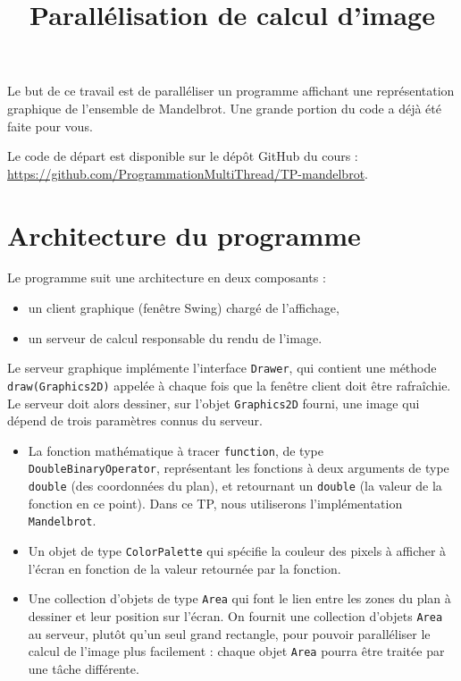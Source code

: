 \documentclass{td}
\title{Parallélisation de calcul d'image}
\begin{document}
\maketitle

Le but de ce travail est de paralléliser un programme affichant une représentation
graphique de l'ensemble de Mandelbrot. Une grande portion du code a déjà été faite pour vous.

Le code de départ est disponible sur le dépôt GitHub du cours :
\url{https://github.com/ProgrammationMultiThread/TP-mandelbrot}.

\section{Architecture du programme}

Le programme suit une architecture en deux composants :
\begin{itemize}
\item un client graphique (fenêtre Swing) chargé de l'affichage,
\item un serveur de calcul responsable du rendu de l'image.
\end{itemize}

Le serveur graphique implémente l'interface \lstinline{Drawer}, qui contient une méthode
\lstinline{draw(Graphics2D)} appelée à chaque fois que la fenêtre client doit être rafraîchie.
Le serveur doit alors dessiner, sur l'objet \lstinline{Graphics2D} fourni, une image
qui dépend de trois paramètres connus du serveur.
\begin{itemize}
\item La fonction mathématique à tracer \lstinline{function}, de type \lstinline{DoubleBinaryOperator},
  représentant les fonctions à deux arguments de type \lstinline{double} (des coordonnées du plan),
  et retournant un \lstinline{double} (la valeur de la fonction en ce point).
  Dans ce TP, nous utiliserons l'implémentation \lstinline{Mandelbrot}.
\item Un objet de type \lstinline{ColorPalette} qui spécifie la couleur des pixels à afficher à l'écran
  en fonction de la valeur retournée par la fonction.
\item Une collection d'objets de type \lstinline{Area} qui font le lien entre les zones du plan à dessiner
  et leur position sur l'écran. On fournit une collection d'objets \lstinline{Area} au serveur,
  plutôt qu'un seul grand rectangle, pour pouvoir paralléliser le calcul de l'image plus facilement :
  chaque objet \lstinline{Area} pourra être traitée par une tâche différente.
\end{itemize}
\end{document}
